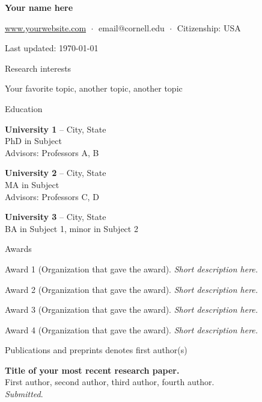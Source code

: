 \documentclass[letterpaper, 10pt]{article}
\newcommand{\heading}[1]{{\Large\color{Mahogany} #1}\medskip}
\begin{document}

{\huge\bf Your name here}\medskip
 
\href{https://en.wikibooks.org/wiki/LaTeX/Hyperlinks}{www.yourwebsite.com} $\;\boldsymbol{\cdot}\;$
email@cornell.edu $\;\boldsymbol{\cdot}\;$ 
Citizenship: USA

Last updated: \today

\bigskip\bigskip


\heading{Research interests}

Your favorite topic, another topic, another topic

\bigskip\bigskip


\heading{Education}

\textbf{University 1} -- City, State \\
PhD in Subject \\
Advisors: Professors A, B \medskip

\textbf{University 2} -- City, State \\
MA in Subject \\
Advisors: Professors C, D \medskip

\textbf{University 3} -- City, State \\
BA in Subject 1, minor in Subject 2

\bigskip\bigskip


\heading{Awards}

 Award 1 (Organization that gave the award). \textit{Short description here.}

 Award 2 (Organization that gave the award). \textit{Short description here.}

 Award 3 (Organization that gave the award). \textit{Short description here.}

 Award 4 (Organization that gave the award). \textit{Short description here.}

\bigskip\bigskip


\heading{Publications and preprints} {\small \hfill * denotes first author(s)}

\textbf{Title of your most recent research paper.} \\ 
First author, second author, third author, fourth author. \\
\textit{Submitted}. \medskip
\end{document}
